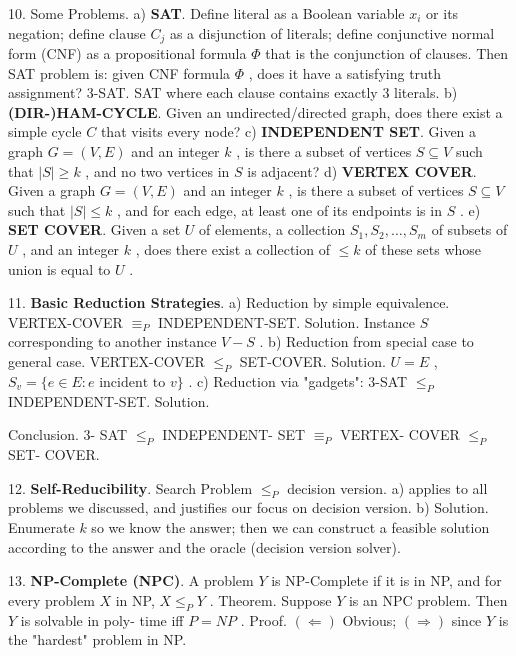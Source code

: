 \documentclass[10pt,a4paper]{article}
\begin{document}
10. Some Problems.
a) \textbf{SAT}. Define literal as a Boolean variable \(x_{i}\) or its negation; define clause \(C_{j}\) as a disjunction of literals; define conjunctive normal form (CNF) as a propositional formula \(\Phi\) that is the conjunction of clauses. Then SAT problem is: given CNF formula \(\Phi\) , does it have a satisfying truth assignment? 3-SAT. SAT where each clause contains exactly 3 literals.
b) \textbf{(DIR-)HAM-CYCLE}. Given an undirected/directed graph, does there exist a simple cycle \(C\) that visits every node?
c) \textbf{INDEPENDENT SET}. Given a graph \(G = (V,E)\) and an integer \(k\) , is there a subset of vertices \(S \subseteq V\) such that \(|S| \geq k\) , and no two vertices in \(S\) is adjacent?
d) \textbf{VERTEX COVER}. Given a graph \(G = (V,E)\) and an integer \(k\) , is there a subset of vertices \(S \subseteq V\) such that \(|S| \leq k\) , and for each edge, at least one of its endpoints is in \(S\) .
e) \textbf{SET COVER}. Given a set \(U\) of elements, a collection \(S_{1}, S_{2}, \ldots , S_{m}\) of subsets of \(U\) , and an integer \(k\) , does there exist a collection of \(\leq k\) of these sets whose union is equal to \(U\) .

11. \textbf{Basic Reduction Strategies}.
a) Reduction by simple equivalence. VERTEX-COVER \(\equiv_{P}\) INDEPENDENT-SET.
Solution. Instance \(S\) corresponding to another instance \(V - S\) .
b) Reduction from special case to general case. VERTEX-COVER \(\leq_{P}\) SET-COVER.
Solution. \(U = E\) , \(S_{v} = \{e\in E:e \text{ incident to } v\}\) .
c) Reduction via "gadgets": 3-SAT \(\leq_{P}\) INDEPENDENT-SET.
Solution.
\begin{center}
\end{center}
Conclusion. 3- SAT \(\leq_{P}\) INDEPENDENT- SET \(\equiv_{P}\) VERTEX- COVER \(\leq_{P}\) SET- COVER.

12. \textbf{Self-Reducibility}. Search Problem \(\leq_{P}\) decision version.
a) applies to all problems we discussed, and justifies our focus on decision version.
b) Solution. Enumerate \(k\) so we know the answer; then we can construct a feasible solution according to the answer and the oracle (decision version solver).

13. \textbf{NP-Complete (NPC)}. A problem \(Y\) is NP-Complete if it is in NP, and for every problem \(X\) in NP, \(X \leq_{P} Y\) .
Theorem. Suppose \(Y\) is an NPC problem. Then \(Y\) is solvable in poly- time iff \(P = NP\) .
Proof. \((\Leftarrow)\) Obvious; \((\Rightarrow)\) since \(Y\) is the "hardest" problem in NP.
\end{document}
